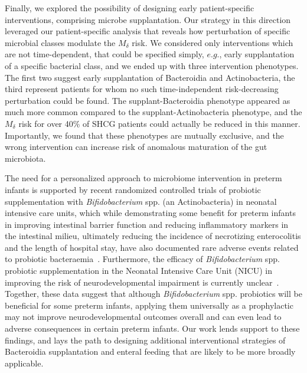 \documentclass[onecolumn,10pt]{IEEEtran}
\def\erisk{$M_\delta$\xspace}
\def\bact{Bacteroidia\xspace}
\def\actn{Actinobacteria\xspace}
\begin{document}
Finally, we explored the possibility of designing early patient-specific interventions, comprising microbe supplantation. Our strategy in this direction leveraged our patient-specific analysis that reveals how perturbation of specific microbial classes modulate the \erisk risk. We considered only interventions which are not time-dependent, that could be specified simply, $e.g.$,  early supplantation of a specific bacterial class, and we ended up with three intervention phenotypes. The first two suggest early supplantation of \bact and \actn, the third represent patients for whom no such time-independent risk-decreasing perturbation could be found. The supplant-\bact  phenotype appeared as much more common compared to the supplant-\actn phenotype, and the \erisk risk for over 40\% of SHCG patients could actually be reduced in this manner. Importantly, we found that these phenotypes are mutually exclusive, and the wrong intervention can  increase risk of anomalous maturation of the gut microbiota.

The need for a personalized approach to microbiome intervention in preterm infants is supported by recent randomized controlled trials of probiotic supplementation with \textit{Bifidobacterium} spp. (an \actn) in neonatal intensive care units, which while  demonstrating some benefit for preterm infants in improving intestinal barrier function\cite{ma2022highly} and reducing inflammatory markers in the intestinal milieu\cite{samara2022supplementation}, ultimately reducing the incidence of necrotizing enterocolitis and the length of hospital stay\cite{morgan2020probiotics}, have also documented rare adverse events related to  probiotic bacteraemia~\cite{acuna2023bifidobacterium}. Furthermore, the efficacy of \textit{Bifidobacterium} spp. probiotic supplementation in the Neonatal Intensive Care Unit (NICU) in  improving the risk of neurodevelopmental impairment is currently unclear~\cite{jacobs2017probiotics}. Together, these data suggest that although \textit{Bifidobacterium} spp. probiotics will be beneficial for some preterm infants, applying them universally as a prophylactic may not improve neurodevelopmental outcomes overall and can even lead to adverse consequences in certain preterm infants. Our work lends support to  these findings, and lays the path to designing additional interventional strategies of \bact supplantation and enteral feeding that are likely to be more broadly applicable.
\end{document}
